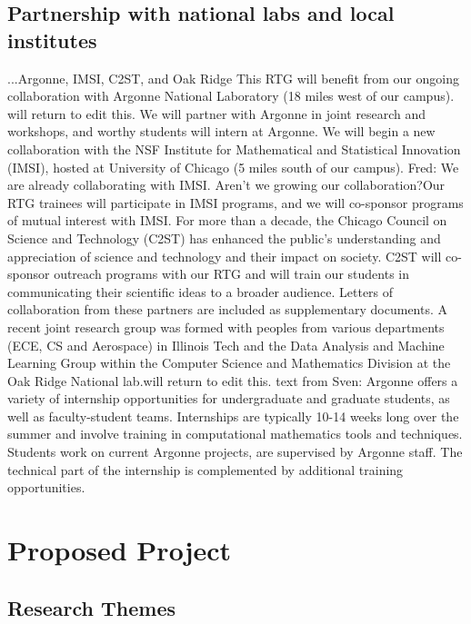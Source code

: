 \documentclass[11pt]{NSFamsart}
\newcommand{\FredNote}[1]{{\color{blue} Fred: #1}}
\begin{document}
\subsection*{Partnership with  national labs and local institutes} 
...{Argonne, IMSI, C2ST, and Oak Ridge}
This RTG will benefit from our ongoing collaboration with Argonne National Laboratory (18 miles west of our campus). 
{\color{magenta}will return to edit this.} We will partner with Argonne in joint research and workshops, and worthy students will intern at Argonne.  We will begin a new collaboration with the NSF Institute for Mathematical and Statistical Innovation (IMSI), hosted at University of Chicago (5 miles south of our campus). \FredNote{We are already collaborating with IMSI.  Aren't we growing our collaboration?}Our RTG trainees will participate in IMSI programs, and we will co-sponsor programs of mutual interest with IMSI.  For more than a decade, the Chicago Council on Science and Technology (C2ST) has enhanced the public’s understanding and appreciation of science and technology and their impact on society. C2ST will co-sponsor outreach programs with our RTG and will train our students in communicating their scientific ideas to a broader audience. Letters of collaboration from these partners are included as supplementary documents.  A recent joint research group was formed with peoples from various departments (ECE, CS and Aerospace) in Illinois Tech and the Data Analysis and Machine Learning Group within the Computer Science and Mathematics Division at the Oak Ridge National lab.{\color{magenta}will return to edit this.}
{\color{magenta}text from Sven:} Argonne offers a variety of internship opportunities for undergraduate and graduate students, as well as faculty-student teams. Internships are typically 10-14 weeks long over the summer and involve training in computational mathematics tools and techniques. Students work on current Argonne projects, are supervised by Argonne staff. The technical part of the internship is complemented by additional training opportunities.



\section{Proposed Project } 
 

\subsection{Research Themes} \label{sec:researchproblems}
\end{document}
